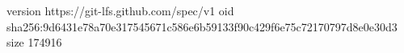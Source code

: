 version https://git-lfs.github.com/spec/v1
oid sha256:9d6431e78a70e317545671c586e6b59133f90c429f6e75c72170797d8e0e30d3
size 174916
